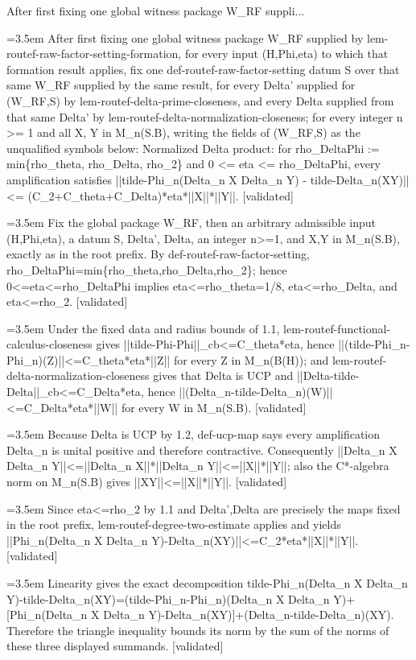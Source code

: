 \documentclass{article}
\newcommand{\step}[1]{\par\noindent\hangindent=3.5em\hangafter=1%
  \makebox[3.5em][l]{\textbf{#1.}}}
\newcommand{\steptag}[1]{\hfill{\small\textsf{[#1]}}}
\begin{document}
\begin{proofbox}{After first fixing one global witness package W\_RF suppli...}
\step{1} After first fixing one global witness package W\_RF supplied by lem-routef-raw-factor-setting-formation, for every input (H,Phi,eta) to which that formation result applies, fix one def-routef-raw-factor-setting datum S over that same W\_RF supplied by the same result, for every Delta' supplied for (W\_RF,S) by lem-routef-delta-prime-closeness, and every Delta supplied from that same Delta' by lem-routef-delta-normalization-closeness; for every integer n >= 1 and all X, Y in M\_n(S.B), writing the fields of (W\_RF,S) as the unqualified symbols below: Normalized Delta product: for rho\_DeltaPhi := min\{rho\_theta, rho\_Delta, rho\_2\} and 0 <= eta <= rho\_DeltaPhi, every amplification satisfies ||tilde-Phi\_n(Delta\_n X Delta\_n Y) - tilde-Delta\_n(XY)|| <= (C\_2+C\_theta+C\_Delta)*eta*||X||*||Y||. \steptag{validated} \\[6pt]
\step{1.1} Fix the global package W\_RF, then an arbitrary admissible input (H,Phi,eta), a datum S, Delta', Delta, an integer n>=1, and X,Y in M\_n(S.B), exactly as in the root prefix. By def-routef-raw-factor-setting, rho\_DeltaPhi=min\{rho\_theta,rho\_Delta,rho\_2\}; hence 0<=eta<=rho\_DeltaPhi implies eta<=rho\_theta=1/8, eta<=rho\_Delta, and eta<=rho\_2. \steptag{validated} \\[4pt]
\step{1.2} Under the fixed data and radius bounds of 1.1, lem-routef-functional-calculus-closeness gives ||tilde-Phi-Phi||\_cb<=C\_theta*eta, hence ||(tilde-Phi\_n-Phi\_n)(Z)||<=C\_theta*eta*||Z|| for every Z in M\_n(B(H)); and lem-routef-delta-normalization-closeness gives that Delta is UCP and ||Delta-tilde-Delta||\_cb<=C\_Delta*eta, hence ||(Delta\_n-tilde-Delta\_n)(W)||<=C\_Delta*eta*||W|| for every W in M\_n(S.B). \steptag{validated} \\[4pt]
\step{1.3} Because Delta is UCP by 1.2, def-ucp-map says every amplification Delta\_n is unital positive and therefore contractive. Consequently ||Delta\_n X Delta\_n Y||<=||Delta\_n X||*||Delta\_n Y||<=||X||*||Y||; also the C*-algebra norm on M\_n(S.B) gives ||XY||<=||X||*||Y||. \steptag{validated} \\[4pt]
\step{1.4} Since eta<=rho\_2 by 1.1 and Delta',Delta are precisely the maps fixed in the root prefix, lem-routef-degree-two-estimate applies and yields ||Phi\_n(Delta\_n X Delta\_n Y)-Delta\_n(XY)||<=C\_2*eta*||X||*||Y||. \steptag{validated} \\[4pt]
\step{1.5} Linearity gives the exact decomposition tilde-Phi\_n(Delta\_n X Delta\_n Y)-tilde-Delta\_n(XY)=(tilde-Phi\_n-Phi\_n)(Delta\_n X Delta\_n Y)+[Phi\_n(Delta\_n X Delta\_n Y)-Delta\_n(XY)]+(Delta\_n-tilde-Delta\_n)(XY). Therefore the triangle inequality bounds its norm by the sum of the norms of these three displayed summands. \steptag{validated} \\[4pt]

\end{proofbox}
\end{document}
